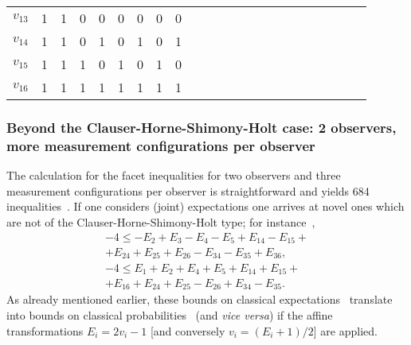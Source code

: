 \begin{table}
\begin{center}
\begin{tabular}{ccccccccccccccccccccccc}
$v_{13}$&1  &  1 &   0 &   0  & {\color{green}  0}&   {\color{green}  0} &  {\color{green}   0}  &  {\color{green}  0}\\
$v_{14}$&1  &  1 &   0 &   1  & {\color{red}  0}&   {\color{red}  1} &  {\color{red}  0}  &  {\color{red}  1}\\
$v_{15}$&1  &  1 &   1 &   0  & {\color{red}  1}&   {\color{red}  0} &  {\color{red}  1}  &  {\color{red}  0}\\
$v_{16}$&1  &  1 &   1 &   1  & {\color{red}  1}&   {\color{red}  1} &  {\color{red}  1}  &  {\color{red}  1} \\
\hline\hline
\end{tabular}
 \end{center}
 \end{table}




\subsubsection*{Beyond the Clauser-Horne-Shimony-Holt case: 2 observers, more measurement configurations per observer}
\label{2017-b-chshc1b}

The calculation for the facet inequalities for two observers and three measurement configurations per observer is straightforward
and yields  684 inequalities~\cite{2000-poly,sliwa-2003,collins-gisin-2003}.
If one considers (joint) expectations one arrives at novel ones
which are not of the Clauser-Horne-Shimony-Holt type; for instance~\cite[p.~166, Eq.~(4)]{sliwa-2003},
\begin{equation}
\begin{split}
-4   \le    -E_2  +E_3 -E_4  -E_5  +E_{14} -E_{15} +    \\+E_{24}  +E_{25}  +E_{26} -E_{34} -E_{35}  +E_{36},     \\
-4 \le   E_1  +E_2   +E_4  +E_5    +E_{14}  +E_{15} + \\+E_{16}  +E_{24}  +E_{25} -E_{26}  +E_{34} -E_{35}.
\end{split}
\label{2017-b-2-3-e-full}
\end{equation}
As already mentioned earlier, these bounds on classical expectations~\cite{sliwa-2003}
translate into bounds on classical probabilities~\cite{2000-poly,collins-gisin-2003} (and {\em vice versa})
if the affine transformations
$E_i = 2 v_i - 1$ [and conversely $v_i = (E_i +1)/2$] are applied.

